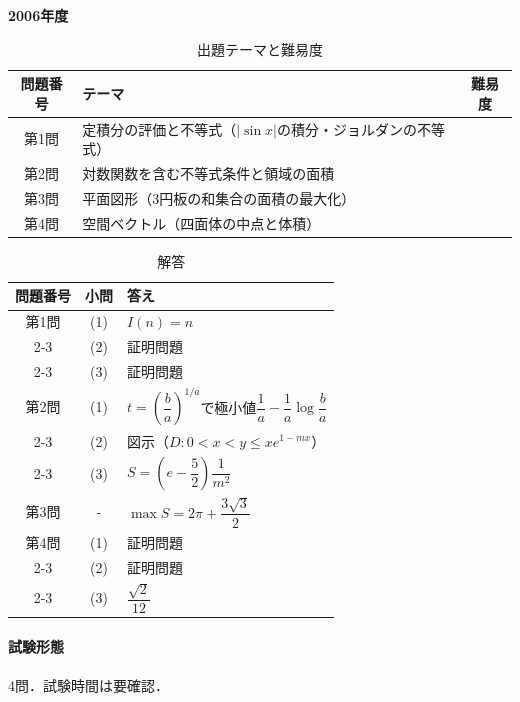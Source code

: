 \documentclass[../../main.tex]{subfiles}
\begin{document}
\begin{center}
  {\fontsize{48pt}{58pt}\selectfont \textbf{2006}\normalsize\textbf{年度}}
\end{center}

\begin{table}[htb]
  \centering
  \caption{出題テーマと難易度}
  \begin{tabular}{|c|p{9cm}|c|}
    \hline
    \textbf{問題番号} & \textbf{テーマ} & \textbf{難易度} \\
    \hline
    第1問 & 定積分の評価と不等式（$|\sin x|$の積分・ジョルダンの不等式） & \\
    \hline
    第2問 & 対数関数を含む不等式条件と領域の面積 & \\
    \hline
    第3問 & 平面図形（3円板の和集合の面積の最大化） & \\
    \hline
    第4問 & 空間ベクトル（四面体の中点と体積） & \\
    \hline
  \end{tabular}
\end{table}

\begin{table}[htb]
  \centering
  \caption{解答}
  \renewcommand{\arraystretch}{1.4}
  \begin{tabular}{|c|c|p{9cm}|}
    \hline
    \textbf{問題番号} & \textbf{小問} & \textbf{答え} \\
    \hline
    第1問 & (1) & $I(n)=n$ \\
    \cline{2-3}
    & (2) & 証明問題 \\
    \cline{2-3}
    & (3) & 証明問題 \\
    \hline
    第2問 & (1) & $t=\left(\dfrac{b}{a}\right)^{1/a}$で極小値$\dfrac{1}{a}-\dfrac{1}{a}\log\dfrac{b}{a}$ \\
    \cline{2-3}
    & (2) & 図示（$D:0<x<y\le xe^{1-mx}$） \\
    \cline{2-3}
    & (3) & $S=\left(e-\dfrac{5}{2}\right)\dfrac{1}{m^2}$ \\
    \hline
    第3問 & - & $\max S=2\pi+\dfrac{3\sqrt{3}}{2}$ \\
    \hline
    第4問 & (1) & 証明問題 \\
    \cline{2-3}
    & (2) & 証明問題 \\
    \cline{2-3}
    & (3) & $\dfrac{\sqrt{2}}{12}$ \\
    \hline
  \end{tabular}
\end{table}

\paragraph{試験形態}
4問．試験時間は要確認．
\end{document}

